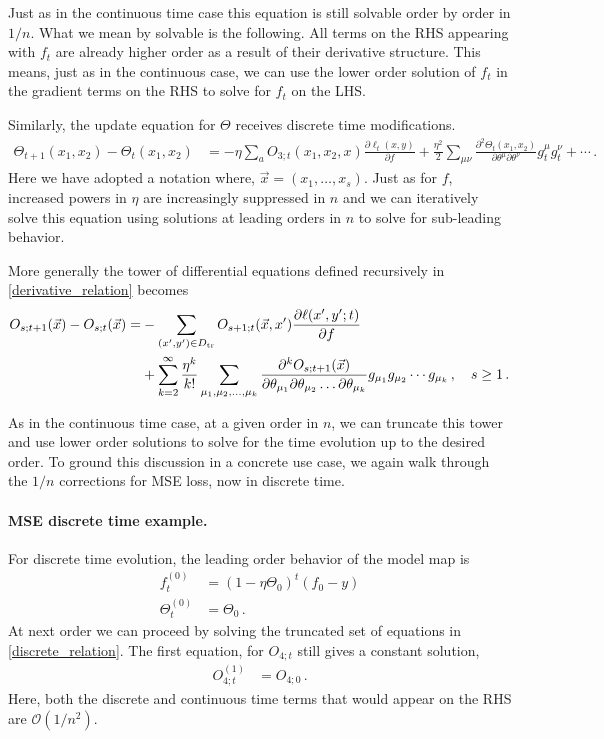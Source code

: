 \documentclass[english]{article}
\newcommand{\es}[2] {\begin{align} \label{#1} #2 \end{align}}
\begin{document}
Just as in the continuous time case this equation is still solvable order by order in $1/n$.
What we mean by solvable is the following. All terms on the RHS appearing with $f_{t}$ are already higher order as a result of their derivative structure. This means, just as in the continuous case, we can use the lower order solution of $f_{t}$ in the gradient terms on the RHS to solve for $f_{t}$ on the LHS. 

Similarly, the update equation for $\Theta$ receives discrete time modifications.
\es{disc_theta_update}{
\Theta_{t+1}(x_1,x_2)- \Theta_{t}(x_1,x_2)&=-\eta \sum_{a}O_{3;t}(x_1,x_2,x)\frac{\partial \ell_{t}(x,y)}{\partial f}+\frac{\eta^{2}}{2}\sum_{\mu\nu}\frac{\partial^{2}\Theta_{t}(x_1,x_2)}{\partial\theta^{\mu}\partial\theta^{\nu}}g^{\mu}_{t}g^{\nu}_{t}+\cdots\,.
}
Here we have adopted a notation where, $\vec{x}=(x_1,\ldots,x_s)$. Just as for $f$, increased powers in $\eta$ are increasingly suppressed in $n$ and we can iteratively solve this equation using solutions at leading orders in $n$ to solve for sub-leading behavior. 

More generally the tower of differential equations defined recursively in \eqref{derivative_relation} becomes
\es{discrete_relation}{
O_{s;t+1}(\vec{x}) - O_{s;t}(\vec{x})=&-\sum_{(x',y')\in\Dtr} O_{s+1;t}(\vec{x},x')\frac{\partial \ell(x',y';t)}{\partial f}\nonumber\\
&+\sum_{k=2}^{\infty}\frac{\eta^{k}}{k!}\sum_{\mu_1,\mu_2,\dots,\mu_k}\frac{\partial^{k}O_{s;t+1}(\vec{x})}{\partial \theta_{\mu_1}\partial \theta_{\mu_2}\dots\partial\theta_{\mu_k}}g_{\mu_1}g_{\mu_2}\cdots g_{\mu_k}
\,, \quad s \ge 1 \,.
}

As in the continuous time case, at a given order in $n$, we can truncate this tower and use lower order solutions to solve for the time evolution up to the desired order.
To ground this discussion in a concrete use case, we again walk through the $1/n$ corrections for MSE loss, now in discrete time.
\paragraph{MSE discrete time example.}
\*

For discrete time evolution, the leading order behavior of the model map is
\es{lo_sol_disc}{
f_{t}^{(0)}&=\left(1-\eta\Theta_{0}\right)^{t}\left(f_{0}-y\right)\\
\Theta^{(0)}_{t}&=\Theta_{0}\,.
}
At next order we can proceed by solving the truncated set of equations in \eqref{discrete_relation}.
The first equation, for $O_{4;t}$ still gives a constant solution,
\es{truncated_eqs1_disc}{
O_{4;t}^{(1)}&=O_{4;0}\,.
}
Here, both the discrete and continuous time terms that would appear on the RHS are $\mathcal{O}(1/n^{2})$.
\end{document}
